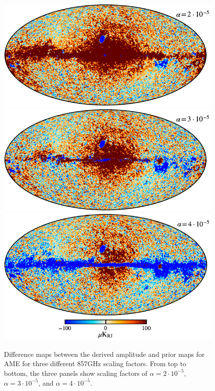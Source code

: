 \documentclass{aa}
\def\,{\thinspace}
\begin{document}
\begin{figure}
  \center
  \includegraphics[width=\linewidth]{figs/ame_mean_prior_diff_scale2_c-planck.pdf}
  \includegraphics[width=\linewidth]{figs/ame_mean_prior_diff_scale3_c-planck.pdf}
  \includegraphics[width=\linewidth]{figs/ame_mean_prior_diff_scale4_cb_c-planck.pdf}
  \caption{Difference maps between the derived amplitude and prior
    maps for AME for three different 857\,GHz scaling factors. From
    top to bottom, the three panels show scaling factors of
    $\alpha=2\cdot10^{-5}$, $\alpha=3\cdot10^{-5}$, and
    $\alpha=4\cdot10^{-5}$.}
  \label{fig:AME_prior_diff}
\end{figure}
\end{document}
